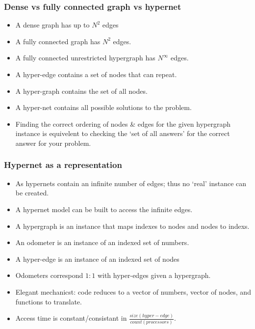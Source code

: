 \documentclass{beamer}
\begin{document}
	\begin{frame}	
	\frametitle{Dense vs fully connected graph vs hypernet}
	\begin{itemize}
	\item A dense graph has up to $N^2$ edges
	\item A fully connected graph has $N^2$ edges.
	\item A fully connected unrestricted hypergraph has $N^{\infty}$ edges.
	\item A hyper-edge contains a set of nodes that can repeat.
	\item A hyper-graph contains the set of all nodes.
	\item A hyper-net contains all possible solutions to the problem.
	\item Finding the correct ordering of nodes \& edges for the given hypergraph instance is equivelent to checking the `set of all answers' for the correct answer for your problem.
	\end{itemize}		
	\end{frame}
	
	\begin{frame}	
	\frametitle{Hypernet as a representation}
	\begin{itemize}
	\item As hypernets contain an infinite number of edges; thus no `real' instance can be created.
	\item A hypernet model can be built to access the infinite edges.
	\item A hypergraph is an instance that maps indexes to nodes and nodes to indexs.
	\item An odometer is an instance of an indexed set of numbers.
	\item A hyper-edge is an instance of an indexed set of nodes
	\item Odometers correspond $1:1$ with hyper-edges given a hypergraph.
	\item Elegant mechanicst: code reduces to a vector of numbers, vector of nodes, and  functions to translate. 
	\item Access time is constant/consistant in $\frac{size(hyper-edge)}{count(processors)}$. 
	\end{itemize}	
	\end{frame}
	
\end{document}
